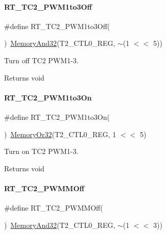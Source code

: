 \paragraph{\texorpdfstring{R\+T\+\_\+\+T\+C2\+\_\+\+P\+W\+M1to3\+Off}{RT\_TC2\_PWM1to3Off}}
{\footnotesize\ttfamily \#define R\+T\+\_\+\+T\+C2\+\_\+\+P\+W\+M1to3\+Off(\begin{DoxyParamCaption}{ }\end{DoxyParamCaption})~\mbox{\hyperlink{a00020_a5c1a2bd4c1bd4c2f429d8042a45327ff}{Memory\+And32}}(T2\+\_\+\+C\+T\+L0\+\_\+\+R\+EG, $\sim$(1 $<$$<$ 5))}



Turn off T\+C2 P\+W\+M1-\/3. 

\begin{DoxyReturn}{Returns}
void 
\end{DoxyReturn}
\mbox{\label{a00047_adc090dee2463a2a27b57234e63f0c0b5}} 
\paragraph{\texorpdfstring{R\+T\+\_\+\+T\+C2\+\_\+\+P\+W\+M1to3\+On}{RT\_TC2\_PWM1to3On}}
{\footnotesize\ttfamily \#define R\+T\+\_\+\+T\+C2\+\_\+\+P\+W\+M1to3\+On(\begin{DoxyParamCaption}{ }\end{DoxyParamCaption})~\mbox{\hyperlink{a00020_a9ea92ebccdef6bdaca4d00210cc7266d}{Memory\+Or32}}(T2\+\_\+\+C\+T\+L0\+\_\+\+R\+EG, 1 $<$$<$ 5)}



Turn on T\+C2 P\+W\+M1-\/3. 

\begin{DoxyReturn}{Returns}
void 
\end{DoxyReturn}
\mbox{\label{a00047_abe6d0acfd60eb7058f0622de867c5b87}} 
\paragraph{\texorpdfstring{R\+T\+\_\+\+T\+C2\+\_\+\+P\+W\+M\+M\+Off}{RT\_TC2\_PWMMOff}}
{\footnotesize\ttfamily \#define R\+T\+\_\+\+T\+C2\+\_\+\+P\+W\+M\+M\+Off(\begin{DoxyParamCaption}{ }\end{DoxyParamCaption})~\mbox{\hyperlink{a00020_a5c1a2bd4c1bd4c2f429d8042a45327ff}{Memory\+And32}}(T2\+\_\+\+C\+T\+L0\+\_\+\+R\+EG, $\sim$(1 $<$$<$ 3))}



